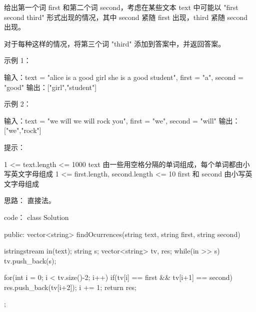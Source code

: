 给出第一个词 first 和第二个词 second，考虑在某些文本 text 中可能以 "first second third" 形式出现的情况，其中 second 紧随 first 出现，third 紧随 second 出现。

对于每种这样的情况，将第三个词 "third" 添加到答案中，并返回答案。

 

示例 1：

输入：text = "alice is a good girl she is a good student", first = "a", second = "good"
输出：["girl","student"]

示例 2：

输入：text = "we will we will rock you", first = "we", second = "will"
输出：["we","rock"]

 

提示：

    1 <= text.length <= 1000
    text 由一些用空格分隔的单词组成，每个单词都由小写英文字母组成
    1 <= first.length, second.length <= 10
    first 和 second 由小写英文字母组成






























思路：
直接法。




























code：
class Solution {
public:
    vector<string> findOcurrences(string text, string first, string second) {
        istringstream in(text);
        string s;
        vector<string> tv, res;
        while(in >> s)
            tv.push_back(s);
        
        for(int i = 0; i < tv.size()-2; i++)
        {
            if(tv[i] == first && tv[i+1] == second)
            {
                res.push_back(tv[i+2]);
                i += 1;
            }
        }
        return res;
    }
};